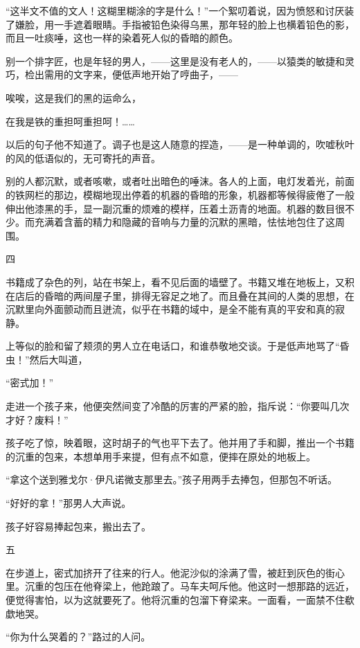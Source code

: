 \documentclass[11pt,a4paper]{ctexart}
\begin{document}
\begin{materialtext}
“这半文不值的文人！这糊里糊涂的字是什么！”一个絮叨着说，因为愤怒和讨厌装了嫌脸，用一手遮着眼睛。手指被铅色染得乌黑，那年轻的脸上也横着铅色的影，而且一吐痰唾，这也一样的染着死人似的昏暗的颜色。

别一个排字匠，也是年轻的男人，——这里是没有老人的，——以猿类的敏捷和灵巧，检出需用的文字来，便低声地开始了哼曲子，——

唉唉，这是我们的黑的运命么，

在我是铁的重担呵重担呵！……

以后的句子他不知道了。调子也是这人随意的捏造，——是一种单调的，吹嘘秋叶的风的低语似的，无可寄托的声音。

别的人都沉默，或者咳嗽，或者吐出暗色的唾沫。各人的上面，电灯发着光，前面的铁网栏的那边，模糊地现出停着的机器的昏暗的形象，机器都等候得疲倦了一般伸出他漆黑的手，显一副沉重的烦难的模样，压着土沥青的地面。机器的数目很不少。而充满着含蓄的精力和隐藏的音响与力量的沉默的黑暗，怯怯地包住了这周围。

\begin{center}四\end{center}

书籍成了杂色的列，站在书架上，看不见后面的墙壁了。书籍又堆在地板上，又积在店后的昏暗的两间屋子里，排得无容足之地了。而且叠在其间的人类的思想，在沉默里向外面颤动而且迸流，似乎在书籍的域中，是全不能有真的平安和真的寂静。

上等似的脸和留了颊须的男人立在电话口，和谁恭敬地交谈。于是低声地骂了“昏虫！”然后大叫道，

“密式加！”

走进一个孩子来，他便突然间变了冷酷的厉害的严紧的脸，指斥说：“你要叫几次才好？废料！”

孩子吃了惊，映着眼，这时胡子的气也平下去了。他并用了手和脚，推出一个书籍的沉重的包来，本想单用手来提，但有点不如意，便摔在原处的地板上。

“拿这个送到雅戈尔·伊凡诺微支那里去。”孩子用两手去捧包，但那包不听话。

“好好的拿！”那男人大声说。

孩子好容易捧起包来，搬出去了。

\begin{center}五\end{center}

在步道上，密式加挤开了往来的行人。他泥沙似的涂满了雪，被赶到灰色的街心里。沉重的包压在他脊梁上，他跄踉了。马车夫呵斥他。他这时一想那路的远近，便觉得害怕，以为这就要死了。他将沉重的包溜下脊梁来。一面看，一面禁不住欷歔地哭。

“你为什么哭着的？”路过的人问。


\end{materialtext}
\end{document}
